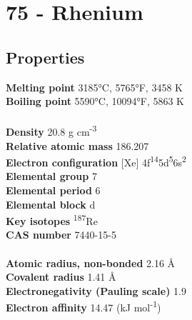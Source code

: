 \section{75 - Rhenium}
\label{sec:elem-rhenium}
\subsection{Properties}
\textbf{Melting point} 3185°C, 5765°F, 3458 K\\
\textbf{Boiling point} 5590°C, 10094°F, 5863 K\\
\\
\textbf{Density} 20.8 g cm\textsuperscript{-3}\\
\textbf{Relative atomic mass} 186.207\\
\textbf{Electron configuration} [Xe] 4f\textsuperscript{14}5d\textsuperscript{5}6s\textsuperscript{2}\\
\textbf{Elemental group} 7\\
\textbf{Elemental period} 6\\
\textbf{Elemental block} d\\
\textbf{Key isotopes} \textsuperscript{187}Re\\
\textbf{CAS number} 7440-15-5\\
\\
\textbf{Atomic radius, non-bonded} 2.16 Å\\
\textbf{Covalent radius} 1.41 Å\\
\textbf{Electronegativity (Pauling scale)} 1.9\\
\textbf{Electron affinity} 14.47 (kJ mol\textsuperscript{-1})\\